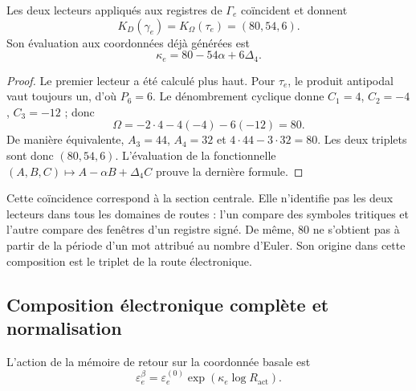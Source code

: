 \begin{theorem}
Les deux lecteurs appliqués aux registres de \(\Gamma_e\) coïncident et donnent
\begin{equation}
 K_D(\gamma_e)=K_\Omega(\tau_e)=(80,54,6).
 \label{eq:el-triple}
\end{equation}
Son évaluation aux coordonnées déjà générées est
\begin{equation}
 \kappa_e=80-54\alpha+6\Delta_4.
 \label{eq:el-kappa}
\end{equation}
\end{theorem}
\begin{proof}
Le premier lecteur a été calculé plus haut. Pour \(\tau_e\), le produit
antipodal vaut toujours un, d'où \(P_6=6\). Le dénombrement cyclique donne
\(C_1=4\), \(C_2=-4\), \(C_3=-12\) ; donc
\[
 \Omega=-2\cdot4-4(-4)-6(-12)=80.
\]
De manière équivalente, \(A_3=44\), \(A_4=32\) et \(4\cdot44-3\cdot32=80\). Les deux triplets sont donc \((80,54,6)\). L'évaluation de la fonctionnelle \((A,B,C)\mapsto A-\alpha B+\Delta_4C\) prouve la dernière formule.
\end{proof}

Cette coïncidence correspond à la section centrale. Elle n'identifie pas les deux lecteurs dans tous les domaines de routes : l'un compare des symboles tritiques et l'autre compare des fenêtres d'un registre signé. De même, \(80\) ne s'obtient pas à partir de la période d'un mot attribué au nombre d'Euler. Son origine dans cette composition est le triplet de la route électronique.

\subsection{Composition électronique complète et normalisation}

\begin{definition}
L'action de la mémoire de retour sur la coordonnée basale est
\begin{equation}
 \varepsilon_e^\beta
 =\varepsilon_e^{(0)}\exp\!\left(\kappa_e\log R_{\mathrm{act}}\right).
 \label{eq:el-beta}
\end{equation}
\end{definition}

